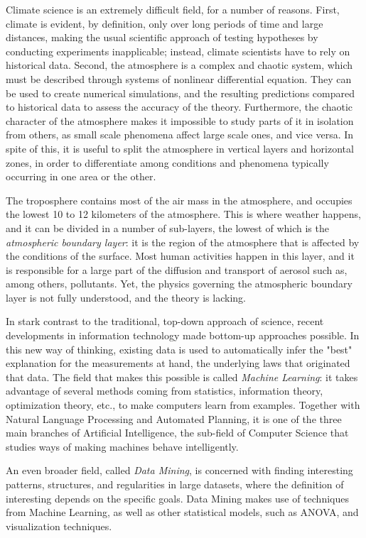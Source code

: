 \documentclass[a4paper]{book}
\begin{document}
Climate science is an extremely difficult field, for a number of reasons. First, climate is evident, by definition, only over long periods of time and large distances, making the usual scientific approach of testing hypotheses by conducting experiments inapplicable; instead, climate scientists have to rely on historical data. Second, the atmosphere is a complex and chaotic system, which must be described through systems of nonlinear differential equation. They can be used to create numerical simulations, and the resulting predictions compared to historical data to assess the accuracy of the theory. Furthermore, the chaotic character of the atmosphere makes it impossible to study parts of it in isolation from others, as small scale phenomena affect large scale ones, and vice versa. In spite of this, it is useful to split the atmosphere in vertical layers and horizontal zones, in order to differentiate among conditions and phenomena typically occurring in one area or the other. 

The troposphere contains most of the air mass in the atmosphere, and occupies the lowest 10 to 12 kilometers of the atmosphere. This is where weather happens, and it can be divided in a number of sub-layers, the lowest of which is the \emph{atmospheric boundary layer}: it is the region of the atmosphere that is affected by the conditions of the surface. Most human activities happen in this layer, and it is responsible for a large part of the diffusion and transport of aerosol such as, among others, pollutants. Yet, the physics governing the atmospheric boundary layer is not fully understood, and the theory is lacking.

In stark contrast to the traditional, top-down approach of science, recent developments in information technology made bottom-up approaches possible. In this new way of thinking, existing data is used to automatically infer the "best" explanation for the measurements at hand, the underlying laws that originated that data. The field that makes this possible is called \emph{Machine Learning}: it takes advantage of several methods coming from statistics, information theory, optimization theory, etc., to make computers learn from examples. Together with Natural Language Processing and Automated Planning, it is one of the three main branches of Artificial Intelligence, the sub-field of Computer Science that studies ways of making machines behave intelligently.

An even broader field, called \emph{Data Mining}, is concerned with finding interesting patterns, structures, and regularities in large datasets, where the definition of interesting depends on the specific goals. Data Mining makes use of techniques from Machine Learning, as well as other statistical models, such as ANOVA, and visualization techniques.
\end{document}
